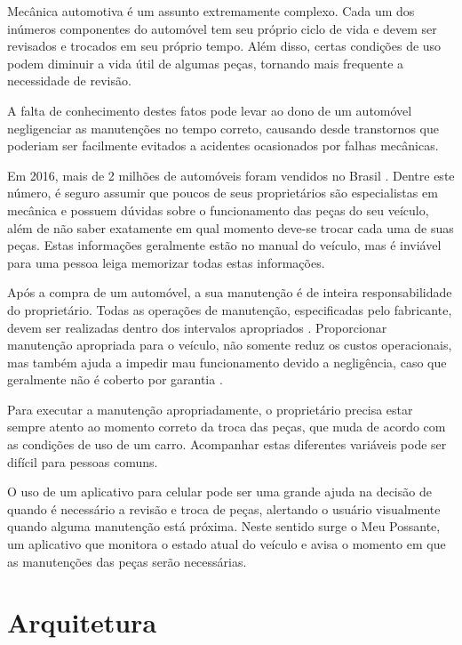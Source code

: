 \label{meupossante}
Mecânica automotiva é um assunto extremamente complexo. Cada um dos inúmeros componentes
do automóvel tem seu próprio ciclo de vida e devem ser revisados e trocados em seu próprio
tempo. Além disso, certas condições de uso podem diminuir a vida útil de algumas peças,
tornando mais frequente a necessidade de revisão.

A falta de conhecimento destes fatos pode levar ao dono de um automóvel negligenciar
as manutenções no tempo correto, causando desde transtornos que poderiam ser facilmente
evitados a acidentes ocasionados por falhas mecânicas.

Em 2016, mais de 2 milhões de automóveis foram vendidos no Brasil
\cite{fenabrave}. Dentre este número, é seguro assumir que poucos de seus
proprietários são especialistas em mecânica e possuem dúvidas sobre o
funcionamento das peças do seu veículo, além de não saber exatamente em qual
momento deve-se trocar cada uma de suas peças. Estas informações geralmente
estão no manual do veículo, mas é inviável para uma pessoa leiga memorizar
todas estas informações.

Após a compra de um automóvel, a sua manutenção é de inteira responsabilidade
do proprietário. Todas as operações de manutenção, especificadas pelo fabricante,
devem ser realizadas dentro dos intervalos apropriados \cite{manualhyundai}.
Proporcionar manutenção apropriada para o veículo, não somente reduz os custos
operacionais, mas também ajuda a impedir mau funcionamento devido a negligência,
caso que geralmente não é coberto por garantia \cite{manualonix}.

Para executar a manutenção apropriadamente, o proprietário precisa estar
sempre atento ao momento correto da troca das peças, que muda de acordo
com as condições de uso de um carro. Acompanhar estas diferentes variáveis pode
ser difícil para pessoas comuns.

O uso de um aplicativo para celular pode ser uma grande ajuda na decisão de quando
é necessário a revisão e troca de peças, alertando o usuário visualmente quando alguma
manutenção está próxima. Neste sentido surge o Meu Possante, um aplicativo que monitora
o estado atual do veículo e avisa o momento em que as manutenções das peças serão
necessárias.

\section{Arquitetura}
\label{meupossante-app}

